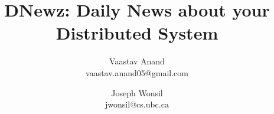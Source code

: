 \documentclass[10pt,twocolumn]{article}
\title{DNewz: Daily News about your Distributed System}
\author{Vaastav Anand \\ vaastav.anand05@gmail.com  \and Joseph Wonsil \\ jwonsil@cs.ubc.ca}
\date{}
\begin{document}
\maketitle

















\balance
{\footnotesize


}
\end{document}

